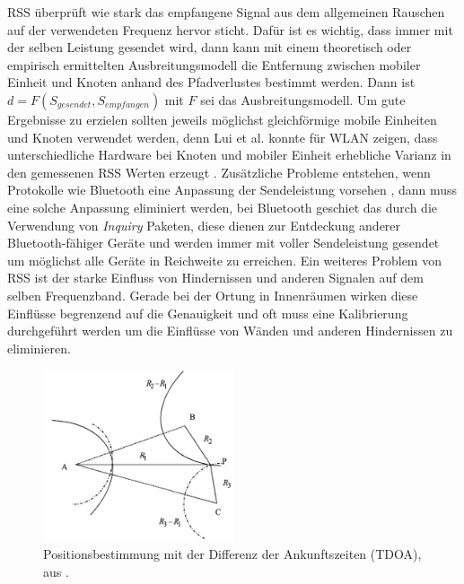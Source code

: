 RSS überprüft wie stark das empfangene Signal aus dem allgemeinen Rauschen auf der verwendeten Frequenz hervor sticht. Dafür ist es wichtig, dass immer mit der selben Leistung gesendet wird, dann kann mit einem theoretisch oder empirisch ermittelten Ausbreitungsmodell die Entfernung zwischen mobiler Einheit und Knoten anhand des Pfadverlustes bestimmt werden. Dann ist $d = F(S_{gesendet},S_{empfangen})$ mit $F$ sei das Ausbreitungsmodell. Um gute Ergebnisse zu erzielen sollten jeweils möglichst gleichförmige mobile Einheiten und Knoten verwendet werden, denn Lui et al. konnte für WLAN zeigen, dass unterschiedliche Hardware bei Knoten und mobiler Einheit erhebliche Varianz in den gemessenen RSS Werten erzeugt \cite{lui2011differences}. Zusätzliche Probleme entstehen, wenn Protokolle wie Bluetooth eine Anpassung der Sendeleistung vorsehen \cite{hossain2007comprehensive}, dann muss eine solche Anpassung eliminiert werden, bei Bluetooth geschiet das durch die Verwendung von \textit{Inquiry} Paketen, diese dienen zur Entdeckung anderer Bluetooth-fähiger Geräte und werden immer mit voller Sendeleistung gesendet um möglichst alle Geräte in Reichweite zu erreichen.
Ein weiteres Problem von RSS ist der starke Einfluss von Hindernissen und anderen  Signalen auf dem selben Frequenzband. Gerade bei der Ortung in Innenräumen wirken diese Einflüsse begrenzend auf die Genauigkeit und oft muss eine Kalibrierung durchgeführt werden um die Einflüsse von Wänden und anderen Hindernissen zu eliminieren.

\begin{figure}[!htbp]
  \centering
	\includegraphics[width=0.5\textwidth]{images/tdoa.png}
  \caption{Positionsbestimmung mit der Differenz der Ankunftszeiten (TDOA), aus \cite{liu2007survey}.}
  \label{fig:tdoa}
\end{figure}

